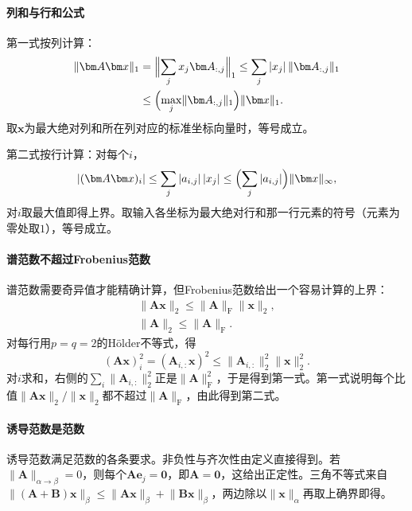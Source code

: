\paragraph{列和与行和公式}
第一式按列计算：
\[
 \begin{aligned}
 \lVert\bm A\bm x\rVert_1
 &=\Bigl\lVert\sum_jx_j\bm A_{:,j}\Bigr\rVert_1
 \leq\sum_j|x_j|\,\lVert\bm A_{:,j}\rVert_1\\
 &\leq\Bigl(\max_j\lVert\bm A_{:,j}\rVert_1\Bigr)\lVert\bm x\rVert_1.
 \end{aligned}
\]
取$\bm x$为最大绝对列和所在列对应的标准坐标向量时，等号成立。

第二式按行计算：对每个$i$，
\[
 |(\bm A\bm x)_i|\leq\sum_j|a_{i,j}|\,|x_j|\leq\Bigl(\sum_j|a_{i,j}|\Bigr)\lVert\bm x\rVert_\infty,
\]
对$i$取最大值即得上界。取输入各坐标为最大绝对行和那一行元素的符号（元素为零处取$1$），等号成立。

\paragraph{谱范数不超过Frobenius范数}
谱范数需要奇异值才能精确计算，但Frobenius范数给出一个容易计算的上界：
\begin{equation}
 \begin{gathered}
 \lVert\bm A\bm x\rVert_2\leq\lVert\bm A\rVert_{\mathrm F}\lVert\bm x\rVert_2,\\
 \lVert\bm A\rVert_2\leq\lVert\bm A\rVert_{\mathrm F}.
 \end{gathered}
 \label{eq:ls-spectral-frobenius-bound}
\end{equation}
对每行用$p=q=2$的Hölder不等式，得
\[
 (\bm A\bm x)_i^2=(\bm A_{i,:}\bm x)^2\leq\lVert\bm A_{i,:}\rVert_2^2\lVert\bm x\rVert_2^2 .
\]
对$i$求和，右侧的$\sum_i\lVert\bm A_{i,:}\rVert_2^2$正是$\lVert\bm A\rVert_{\mathrm F}^2$，于是得到第一式。第一式说明每个比值$\lVert\bm A\bm x\rVert_2/\lVert\bm x\rVert_2$都不超过$\lVert\bm A\rVert_{\mathrm F}$，由此得到第二式。

\paragraph{诱导范数是范数}
诱导范数满足范数的各条要求。非负性与齐次性由定义直接得到。若$\lVert\bm A\rVert_{\alpha\to\beta}=0$，则每个$\bm A\bm e_j=\bm0$，即$\bm A=\bm0$，这给出正定性。三角不等式来自$\lVert(\bm A+\bm B)\bm x\rVert_\beta\leq\lVert\bm A\bm x\rVert_\beta+\lVert\bm B\bm x\rVert_\beta$，两边除以$\lVert\bm x\rVert_\alpha$再取上确界即得。

